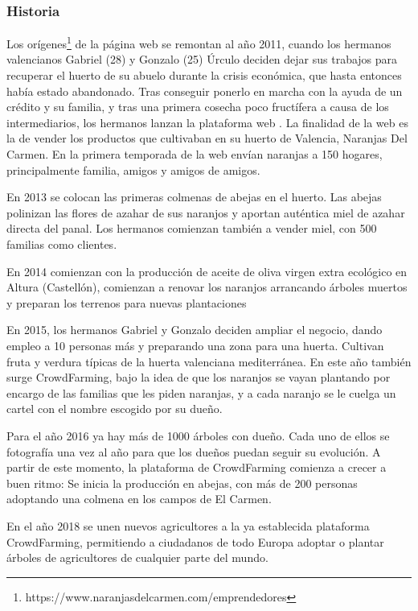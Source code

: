 
\subsubsection{Historia}

Los orígenes\footnote{https://www.naranjasdelcarmen.com/emprendedores} de la página web se remontan al año 2011, cuando los hermanos valencianos Gabriel (28) y Gonzalo (25) Úrculo deciden dejar sus trabajos para recuperar el huerto de su abuelo durante la crisis económica, que hasta entonces había estado abandonado. Tras conseguir ponerlo en marcha con la ayuda de un crédito y su familia, y tras una primera cosecha poco fructífera a causa de los intermediarios, los hermanos lanzan la plataforma web . La finalidad de la web es la de vender los productos que cultivaban en su huerto de Valencia, Naranjas Del Carmen. En la primera temporada de la web envían naranjas a 150 hogares, principalmente familia, amigos y amigos de amigos.

En 2013 se colocan las primeras colmenas de abejas en el huerto. Las abejas polinizan las flores de azahar de sus naranjos y aportan auténtica miel de azahar directa del panal. Los hermanos comienzan también a vender miel, con 500 familias como clientes.

En 2014 comienzan con la producción de aceite de oliva virgen extra ecológico en Altura (Castellón), comienzan a renovar los naranjos arrancando árboles muertos y preparan los terrenos para nuevas plantaciones

En 2015, los hermanos Gabriel y Gonzalo deciden ampliar el negocio, dando empleo a 10 personas más y preparando una zona para una huerta. Cultivan fruta y verdura típicas de la huerta valenciana mediterránea. En este año también surge CrowdFarming, bajo la idea de que los naranjos se vayan plantando por encargo de las familias que les piden naranjas, y a cada naranjo se le cuelga un cartel con el nombre escogido por su dueño.

Para el año 2016 ya hay más de 1000 árboles con dueño. Cada uno de ellos se fotografía una vez al año para que los dueños puedan seguir su evolución. A partir de este momento, la plataforma de CrowdFarming comienza a crecer a buen ritmo: Se inicia la producción en abejas, con más de 200 personas adoptando una colmena en los campos de El Carmen.

En el año 2018 se unen nuevos agricultores a la ya establecida plataforma CrowdFarming, permitiendo a ciudadanos de todo Europa adoptar o plantar árboles de agricultores de cualquier parte del mundo.

